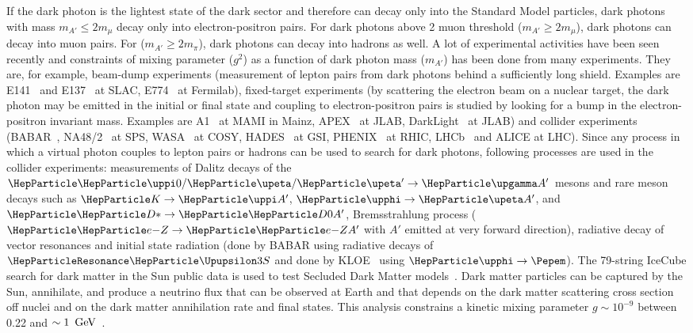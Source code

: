 \documentclass[../report.tex]{subfiles}
\begin{document}
If the dark photon is the lightest state of the dark sector 
and therefore can decay only into the Standard Model particles, dark photons with mass $m_{A'} \le 2m_{\mu}$ decay only into electron-positron pairs. 
For dark photons above 2 muon threshold ($m_{A'} \ge 2m_{\mu}$), 
dark photons can decay into muon pairs. For ($m_{A'} \ge 2m_{\pi}$), 
dark photons can decay into hadrons as well. 
A lot of experimental activities have been seen recently 
and constraints of mixing parameter ($g^2$) as a function 
of dark photon mass ($m_{A'}$) has been done from many experiments. 
They are, for example, 
beam-dump experiments (measurement of lepton pairs from dark photons 
behind a sufficiently long shield. 
Examples are E141~\cite{Riordan:1987aw} and E137~\cite{Bjorken:1988as}
at SLAC, E774~\cite{Bross:1989mp} at Fermilab), 
fixed-target experiments (by scattering the electron beam on a nuclear target, 
the dark photon may be emitted in the initial or final state and coupling to 
electron-positron pairs is studied by looking for a bump in the 
electron-positron invariant mass. Examples are A1~\cite{Merkel:2014avp} 
at MAMI in Mainz, APEX~\cite{Abrahamyan:2011gv} at JLAB, 
DarkLight~\cite{Balewski:2013oza} at JLAB)
and collider experiments (BABAR~\cite{Lees:2014xha}, 
NA48/2~\cite{Batley:2015lha} at SPS, WASA~\cite{Moskal:2014dsa} at COSY, 
HADES~\cite{Agakishiev:2013fwl} at GSI, 
PHENIX~\cite{Adare:2014mgk} at RHIC, LHCb~\cite{Aaij:2017rft} and ALICE at LHC).
Since any process in which a virtual photon couples to lepton pairs or hadrons 
can be used to search for dark photons, 
following processes are used in the collider experiments: measurements of Dalitz decays of the $\PGpz/\PGh/\PGh' \rightarrow \PGg A'$ mesons and rare meson decays such as $\PK\rightarrow \PGp A'$, $\PGf \rightarrow \PGh A'$, 
and $\PDst \rightarrow \PDz A'$,
Bremsstrahlung process 
($\Pem Z \rightarrow \Pem ZA'$ with $A'$ emitted at very forward direction),  
radiative decay of vector resonances and initial state radiation 
(done by BABAR using radiative decays of $\PGUP{3S}$ and 
done by KLOE~\cite{Archilli:2011zc} using $\PGf \rightarrow \Pepem$).
%
The 79-string IceCube search for dark matter in the Sun public data is 
used to test Secluded Dark Matter models~\cite{Ardid:2017lry}. 
Dark matter particles can be captured by the Sun, annihilate, and 
produce a neutrino flux that can be observed at Earth and that 
depends on the dark matter scattering cross section off nuclei
and on the dark matter annihilation rate and final states.
This analysis constrains a kinetic mixing parameter $g \sim 10^{-9}$
between 0.22 and $\sim\unit[1]{\UGeV}$~\cite{Ardid:2017lry}.
\end{document}
